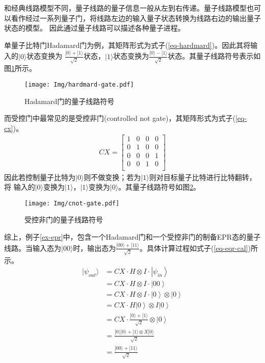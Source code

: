 和经典线路模型不同，量子线路的量子信息一般从左到右传递。量子线路模型也可以看作经过一系列量子门，将线路左边的输入量子状态转换为线路右边的输出量子状态的模型。
因此通过量子线路可以描述各种量子进程。
\begin{example}
    单量子比特门Hadamard门为例，其矩阵形式为式子(\ref{eq-hardmard})。因此其将输入的\(|0\rangle\)状态变换为
\(\frac{|0\rangle+|1\rangle}{\sqrt{2}}\)状态，\(|1\rangle\)状态变换为\(\frac{|0\rangle-|1\rangle}{\sqrt{2}}\)状态。其量子线路符号表示如图\ref{fig-h}所示。
\begin{figure}[htbp]
    \centering
    \texttt{[image: Img/hardmard-gate.pdf]}
    \caption{Hadamard门的量子线路符号}
    \label{fig-h}
\end{figure}

    而受控门中最常见的是受控非门(controlled not gate)，其矩阵形式为式子(\ref{eq-cx})。
    \begin{align}
        \label{eq-cx}
        CX=\left[\begin{matrix}
            1 & 0 & 0 & 0\\
            0 & 1 & 0 & 0\\
            0 & 0 & 0 & 1\\
            0 & 0 & 1 & 0\\
        \end{matrix}\right]
    \end{align}
    因此若控制量子比特为\(|0\rangle\)则不做变换；若为\(|1\rangle\)则对目标量子比特进行比特翻转，将
输入的\(|0\rangle\)变换为\(|1\rangle\)，\(|1\rangle\)变换为\(|0\rangle\)。其量子线路符号如图\ref{fig-cx}。
\begin{figure}[htbp]
    \centering
    \texttt{[image: Img/cnot-gate.pdf]}
    \caption{受控非门的量子线路符号}
    \label{fig-cx}
\end{figure}

综上，例子\ref{ex-epr}中，包含一个Hadamard门和一个受控非门的制备EPR态的量子线路。当输入态为\(|00\rangle\)时，输出态为\(\frac{|00\rangle+|11\rangle}{\sqrt{2}}\)。具体计算过程如式子(\ref{eq-eqr-cal})所示。
\begin{equation}
    \label{eq-eqr-cal}
    \begin{aligned}
        |\psi_{out}\rangle &=  CX\cdot H\otimes I \cdot \left|\psi_{in}\right\rangle\\
        &= CX\cdot H\otimes I \cdot \left|00\right\rangle\\
        &= CX\cdot H\otimes I \cdot \left|0\right\rangle\otimes \left|0\right\rangle\\
        &= CX\cdot H\left|0\right\rangle\otimes I\left|0\right\rangle\\
        &= CX\cdot \frac{|0\rangle+|1\rangle}{\sqrt{2}} \otimes\left|0\right\rangle\\
        &= \frac{|0\rangle|0\rangle+|1\rangle\otimes X|0\rangle}{\sqrt{2}}\\
        &=\frac{|00\rangle+|11\rangle}{\sqrt{2}}
    \end{aligned}
\end{equation}
\end{example}

